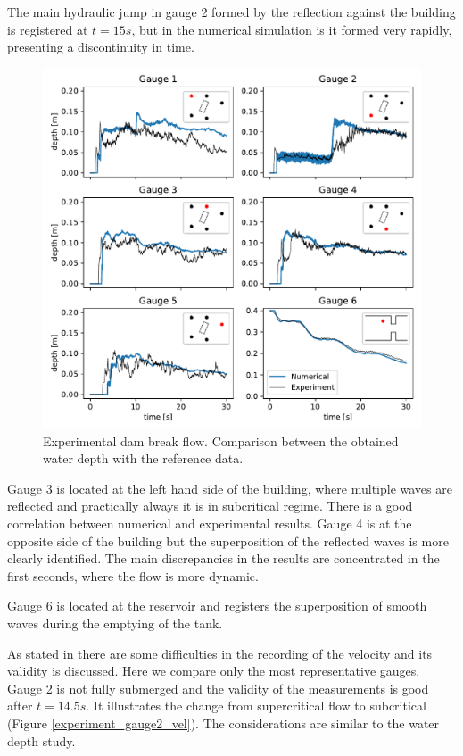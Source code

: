 \documentclass[a4paper,12pt]{elsarticle}
\begin{document}
The main hydraulic jump in gauge 2 formed by the reflection against the building is registered at $t=15s$, but in the numerical simulation is it formed very rapidly, presenting a discontinuity in time.

\begin{figure}
\centering
\includegraphics[width=\textwidth]{img/exp/gauges.pdf}
\caption{Experimental dam break flow. Comparison between the obtained water depth with the reference data.}
\label{experiment_gauges}
\end{figure}

Gauge 3 is located at the left hand side of the building, where multiple waves are reflected and practically always it is in subcritical regime. There is a good correlation between numerical and experimental results. Gauge 4 is at the opposite side of the building but the superposition of the reflected waves is more clearly identified. The main discrepancies in the results are concentrated in the first seconds, where the flow is more dynamic.

Gauge 6 is located at the reservoir and registers the superposition of smooth waves during the emptying of the tank.

As stated in \cite{soares2007} there are some difficulties in the recording of the velocity and its validity is discussed. Here we compare only the most representative gauges. Gauge 2 is not fully submerged and the validity of the measurements is good after $t=14.5s$. It illustrates the change from supercritical flow to subcritical (Figure \ref{experiment_gauge2_vel}). The considerations are similar to the water depth study.
\end{document}
